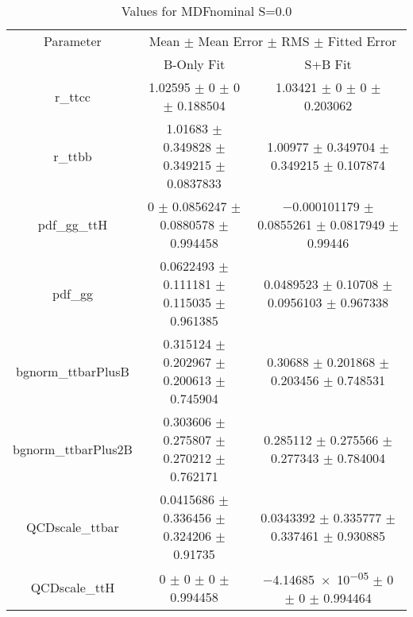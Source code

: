 \begin{table}
\centering
\caption{Values for MDFnominal S=0.0}
\begin{tabular}{ccc}
\toprule
Parameter & \multicolumn{2}{c}{Mean $\pm$ Mean Error $\pm$ RMS $\pm$ Fitted Error}\\
 & B-Only Fit & S+B Fit\\
\midrule
r\_ttcc & \num{1.02595} $\pm$ \num{0} $\pm$ \num{0} $\pm$ \num{0.188504} & \num{1.03421} $\pm$ \num{0} $\pm$ \num{0} $\pm$ \num{0.203062}\\
r\_ttbb & \num{1.01683} $\pm$ \num{0.349828} $\pm$ \num{0.349215} $\pm$ \num{0.0837833} & \num{1.00977} $\pm$ \num{0.349704} $\pm$ \num{0.349215} $\pm$ \num{0.107874}\\
pdf\_gg\_ttH & \num{0} $\pm$ \num{0.0856247} $\pm$ \num{0.0880578} $\pm$ \num{0.994458} & \num{-0.000101179} $\pm$ \num{0.0855261} $\pm$ \num{0.0817949} $\pm$ \num{0.99446}\\
pdf\_gg & \num{0.0622493} $\pm$ \num{0.111181} $\pm$ \num{0.115035} $\pm$ \num{0.961385} & \num{0.0489523} $\pm$ \num{0.10708} $\pm$ \num{0.0956103} $\pm$ \num{0.967338}\\
bgnorm\_ttbarPlusB & \num{0.315124} $\pm$ \num{0.202967} $\pm$ \num{0.200613} $\pm$ \num{0.745904} & \num{0.30688} $\pm$ \num{0.201868} $\pm$ \num{0.203456} $\pm$ \num{0.748531}\\
bgnorm\_ttbarPlus2B & \num{0.303606} $\pm$ \num{0.275807} $\pm$ \num{0.270212} $\pm$ \num{0.762171} & \num{0.285112} $\pm$ \num{0.275566} $\pm$ \num{0.277343} $\pm$ \num{0.784004}\\
QCDscale\_ttbar & \num{0.0415686} $\pm$ \num{0.336456} $\pm$ \num{0.324206} $\pm$ \num{0.91735} & \num{0.0343392} $\pm$ \num{0.335777} $\pm$ \num{0.337461} $\pm$ \num{0.930885}\\
QCDscale\_ttH & \num{0} $\pm$ \num{0} $\pm$ \num{0} $\pm$ \num{0.994458} & \num{-4.14685e-05} $\pm$ \num{0} $\pm$ \num{0} $\pm$ \num{0.994464}\\
\bottomrule
\end{tabular}
\end{table}